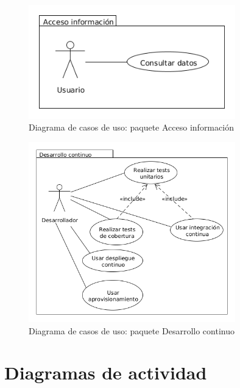 \begin{figure}[!hbt]
  \begin{center}
  \includegraphics[width=0.8\textwidth]{imagenes/diagrama_casos_uso_acceso_informacion.png}
  \caption{Diagrama de casos de uso: paquete Acceso información}
  \label{fig:diag_ca_us_ai}
  \end{center}
\end{figure}

\begin{figure}[!hbt]
  \begin{center}
  \includegraphics[width=0.8\textwidth]{imagenes/diagrama_casos_uso_desarrollo_continuo.png}
  \caption{Diagrama de casos de uso: paquete Desarrollo continuo}
  \label{fig:diag_ca_us_dc}
  \end{center}
\end{figure}

\newpage
\section{Diagramas de actividad}

